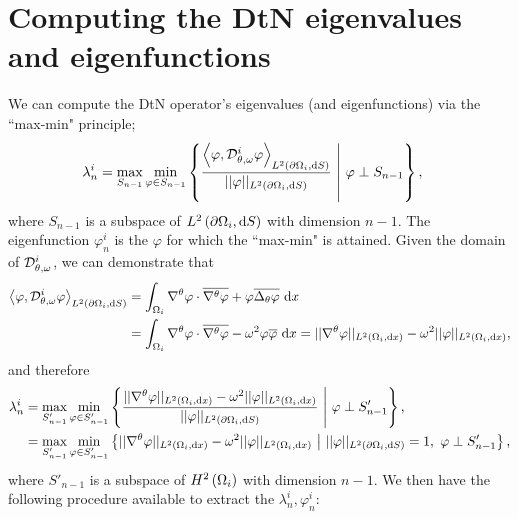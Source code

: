 \documentclass[11pt]{report}
\newcommand{\DtN}{\mathcal{D}}
\newcommand{\di}{\DtN_{\qm, \omega}^i}
\newcommand{\gradgradSob}[1]{H^2\bracs{#1}}
\begin{document}
\section*{Computing the DtN eigenvalues and eigenfunctions}
We can compute the DtN operator's eigenvalues (and eigenfunctions) via the ``max-min" principle;
\begin{align*}
	\lambda^i_n &= \max_{S_{n-1}}\min_{\varphi\in S_{n-1}}\clbracs{ \frac{\ip{\varphi}{\di\varphi}_{\ltwo{\partial\ddom_i}{S}}}{\norm{\varphi}_{\ltwo{\partial\ddom_i}{S}}} \setVert \varphi\perp S_{n-1}},
\end{align*}
where $S_{n-1}$ is a subspace of $L^{2}\left( \partial\Omega_i,\mathrm{d}S \right)$ with dimension $n-1$.
The eigenfunction $\varphi_n^i$ is the $\varphi$ for which the ``max-min" is attained.
Given the domain of $\di$, we can demonstrate that
\begin{align*}
	\ip{\varphi}{\di\varphi}_{\ltwo{\partial\ddom_i}{S}}
	&= \integral{\ddom_i}{ \tgrad \varphi\cdot\overline{\tgrad \varphi} + \varphi\overline{\laplacian_{\qm} \varphi} }{x} \\
	&= \integral{\ddom_i}{ \tgrad \varphi\cdot\overline{\tgrad \varphi} - \omega^2 \varphi\overline{\varphi} }{x}
	= \norm{\tgrad \varphi}_{\ltwo{\ddom_i}{x}} - \omega^2 \norm{\varphi}_{\ltwo{\ddom_i}{x}},
\end{align*}
and therefore
\begin{align*}
	\lambda^i_n 
	&= \max_{S'_{n-1}}\min_{\varphi\in S'_{n-1}}\left\{  \frac{\lvert\lvert \nabla^{\theta} \varphi \rvert\rvert_{L^{2}\left( \Omega_i,\mathrm{d}x \right)} - \omega^2 \lvert\lvert \varphi \rvert\rvert_{L^{2}\left( \Omega_i,\mathrm{d}x \right)}}{\lvert\lvert \varphi \rvert\rvert_{L^{2}\left( \partial\Omega_i,\mathrm{d}S \right)}} \ \middle\vert \  \varphi\perp S'_{n-1}  \right\}, \\
	&= \max_{S'_{n-1}}\min_{\varphi\in S'_{n-1}}\left\{  \lvert\lvert \nabla^{\theta} \varphi \rvert\rvert_{L^{2}\left( \Omega_i,\mathrm{d}x \right)} - \omega^2 \lvert\lvert \varphi \rvert\rvert_{L^{2}\left( \Omega_i,\mathrm{d}x \right)} \ \middle\vert \  \lvert\lvert \varphi \rvert\rvert_{L^{2}\left( \partial\Omega_i,\mathrm{d}S \right)}=1, \ \varphi\perp S'_{n-1}  \right\},
\end{align*}
where $S'_{n-1}$ is a subspace of $\gradgradSob{\ddom_i}$ with dimension $n-1$.
We then have the following procedure available to extract the $\lambda_n^i, \varphi_n^i$:
\end{document}
